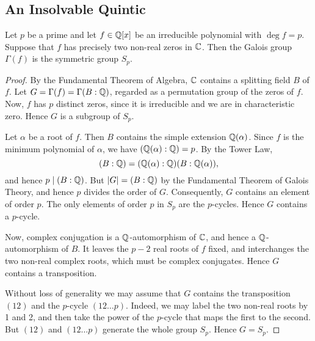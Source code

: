 \subsection{An Insolvable Quintic}
\begin{lemma}\label{lem:galois-gp-symmetric-gp}
	Let $p$ be a prime and let $f \in \mathbb{Q}[x]$ be an irreducible polynomial with $\deg{f} = p$. Suppose that $f$ has precisely two non-real zeros in $\mathbb{C}$. Then the Galois group $\Gamma(f)$ is the symmetric group $S_p$.
	\begin{proof}
		By the Fundamental Theorem of Algebra, $\mathbb{C}$ contains a splitting field $B$ of $f$. Let $G = \Gamma(f) = \Gamma(B : \mathbb{Q})$, regarded as a permutation group of the zeros of $f$. Now, $f$ has $p$ distinct zeros, since it is irreducible and we are in characteristic zero. Hence $G$ is a subgroup of $S_p$.
		
		Let $\alpha$ be a root of $f$. Then $B$ contains the simple extension $\mathbb{Q}(\alpha)$. Since $f$ is the minimum polynomial of $\alpha$, we have $(\mathbb{Q}(\alpha) : \mathbb{Q}) = p$. By the Tower Law,
		\[
			(B : \mathbb{Q}) = (\mathbb{Q}(\alpha) : \mathbb{Q})(B : \mathbb{Q}(\alpha)),
		\]
		and hence $p \mid (B : \mathbb{Q})$. But $|G| = (B : \mathbb{Q})$ by the Fundamental Theorem of Galois Theory, and hence $p$ divides the order of $G$. Consequently, $G$ contains an element of order $p$. The only elements of order $p$ in $S_p$ are the $p$-cycles. Hence $G$ contains a $p$-cycle.
		
		Now, complex conjugation is a $\mathbb{Q}$-automorphism of $\mathbb{C}$, and hence a $\mathbb{Q}$-automorphism of $B$. It leaves the $p - 2$ real roots of $f$ fixed, and interchanges the two non-real complex roots, which must be complex conjugates. Hence $G$ contains a transposition.
		
		Without loss of generality we may assume that $G$ contains the transposition $(12)$ and the $p$-cycle $(12 \dots p)$. Indeed, we may label the two non-real roots by 1 and 2, and then take the power of the $p$-cycle that maps the first to the second. But $(12)$ and $(12 \dots p)$ generate the whole group $S_p$. Hence $G = S_p$.
	\end{proof}
\end{lemma}

